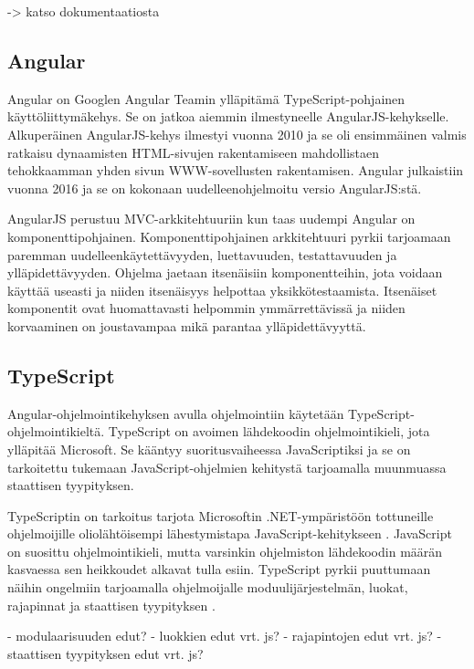 \documentclass[utf8]{gradu3}
\begin{document}
 -> katso dokumentaatiosta

\subsection{Angular}

Angular on Googlen Angular Teamin ylläpitämä TypeScript-pohjainen käyttöliittymäkehys. Se on jatkoa aiemmin ilmestyneelle AngularJS-kehykselle. Alkuperäinen AngularJS-kehys ilmestyi vuonna 2010 ja se oli ensimmäinen valmis ratkaisu dynaamisten HTML-sivujen rakentamiseen mahdollistaen tehokkaamman yhden sivun WWW-sovellusten rakentamisen. Angular julkaistiin vuonna 2016 ja se on kokonaan uudelleenohjelmoitu versio AngularJS:stä.

AngularJS perustuu MVC-arkkitehtuuriin kun taas uudempi Angular on komponenttipohjainen. Komponenttipohjainen arkkitehtuuri pyrkii tarjoamaan paremman uudelleenkäytettävyyden, luettavuuden, testattavuuden ja ylläpidettävyyden. Ohjelma jaetaan itsenäisiin komponentteihin, jota voidaan käyttää useasti ja niiden itsenäisyys helpottaa yksikkötestaamista. Itsenäiset komponentit ovat huomattavasti helpommin ymmärrettävissä ja niiden korvaaminen on joustavampaa mikä parantaa ylläpidettävyyttä. \parencite[]{good-and-bad-angular}

\subsection{TypeScript}

Angular-ohjelmointikehyksen avulla ohjelmointiin käytetään TypeScript-ohjelmointikieltä. TypeScript on avoimen lähdekoodin ohjelmointikieli, jota ylläpitää Microsoft. Se kääntyy suoritusvaiheessa JavaScriptiksi ja se on tarkoitettu tukemaan JavaScript-ohjelmien kehitystä tarjoamalla muunmuassa staattisen tyypityksen. 

TypeScriptin on tarkoitus tarjota Microsoftin .NET-ympäristöön tottuneille ohjelmoijille oliolähtöisempi lähestymistapa JavaScript-kehitykseen \parencite[]{maharry-typescript}. JavaScript on suosittu ohjelmointikieli, mutta varsinkin ohjelmiston lähdekoodin määrän kasvaessa sen heikkoudet alkavat tulla esiin. TypeScript pyrkii puuttumaan näihin ongelmiin tarjoamalla ohjelmoijalle moduulijärjestelmän, luokat, rajapinnat ja staattisen tyypityksen \parencite[]{understanding-typescript}.

- modulaarisuuden edut?
- luokkien edut vrt. js?
- rajapintojen edut vrt. js?
- staattisen tyypityksen edut vrt. js?
\end{document}
